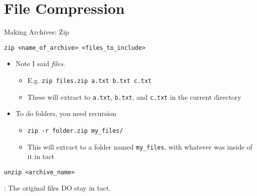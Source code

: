 %

%
\section{File Compression}
\label{sec:file_compression}

\begin{frame}[fragile]{Making Archives: Zip}
  \begin{block}{}
    \texttt{zip <name\_of\_archive> <files\_to\_include>}
    \begin{itemize}
      \item Note I said \emph{files}.
      \begin{itemize}
        \item E.g. \texttt{zip files.zip a.txt b.txt c.txt}
        \item These will extract to \texttt{a.txt}, \texttt{b.txt}, and \texttt{c.txt} in the current directory
      \end{itemize}
        \item To do folders, you need recursion
      \begin{itemize}
        \item \texttt{zip -r folder.zip my\_files/}
        \item This will extract to a folder named \texttt{my\_files}, with whatever was inside of it in tact
      \end{itemize}
    \end{itemize}
  \end{block}
  \begin{block}{}
    \texttt{unzip <archive\_name>}
  \end{block}
  : The original files DO stay in tact.
\end{frame}

